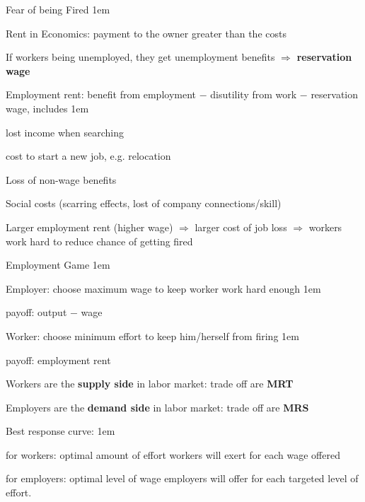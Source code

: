 \documentclass[11pt,aspectratio=43,usenames,dvipsnames]{beamer}
\let\olditemize=\itemize
\let\endolditemize=\enditemize
\renewenvironment{itemize}{\olditemize \itemsep1em}{\endolditemize}
\let\oldenumerate=\enumerate
\let\endoldenumerate=\endenumerate
\renewenvironment{enumerate}{\oldenumerate \itemsep1em}{ \endoldenumerate}
\theoremstyle{definition}
\begin{document}
\begin{frame}{Fear of being Fired}
\label{slide:Fear_of_Fired}
    \begin{itemize}
        \item \alert{Rent} in Economics: payment to the owner greater than the costs
        \item If workers being unemployed, they get unemployment benefits $ \Rightarrow  $ \textbf{reservation wage}
        \item \alert{Employment rent}: benefit from employment $ - $ disutility from work $ - $ reservation wage, includes
        \begin{itemize}
            \item lost income when searching
            \item cost to start a new job, e.g. relocation
            \item Loss of non-wage benefits
            \item Social costs (scarring effects, lost of company connections/skill)
        \end{itemize}
        \item \alert{Larger employment rent (higher wage)} $ \Rightarrow  $ larger cost of job loss $ \Rightarrow  $ workers work hard to reduce chance of getting fired
    \end{itemize}
\end{frame}

\begin{frame}{Employment Game}
\label{slide:Employment_Game}
    \begin{enumerate}
        \item Employer: choose maximum wage to keep worker work hard enough
        \begin{itemize}
            \item payoff: output $ - $ wage
        \end{itemize}
        \item Worker: choose minimum effort to keep him/herself from firing
        \begin{itemize}
            \item payoff: employment rent
        \end{itemize}
        \item Workers are the \textbf{supply side} in labor market: trade off are \textbf{MRT}
        \item Employers are the \textbf{demand side} in labor market: trade off are \textbf{MRS}
        \item \alert{Best response curve}:
        \begin{itemize}
            \item for workers: optimal amount of effort workers will exert for each wage offered
            \item for employers: optimal level of wage employers will offer for each targeted level of effort.
        \end{itemize}
    \end{enumerate}
\end{frame}
\end{document}
